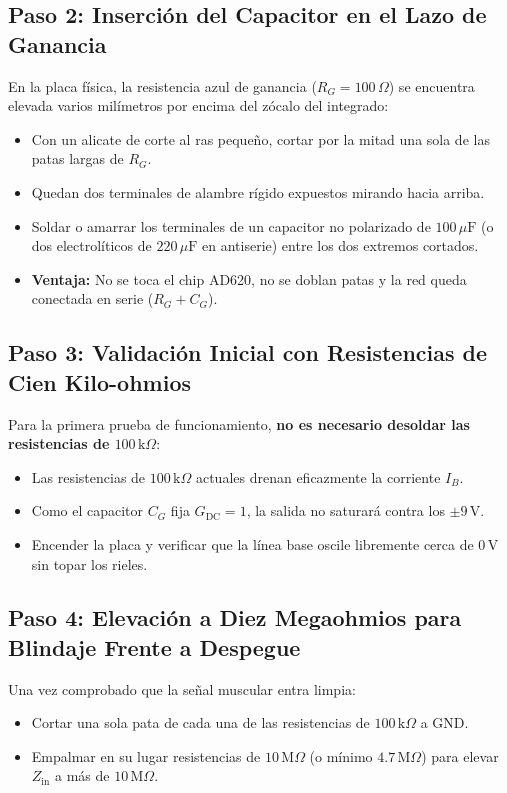 \documentclass[11pt,a4paper]{article}
\begin{document}
\subsection{Paso 2: Inserción del Capacitor en el Lazo de Ganancia}
En la placa física, la resistencia azul de ganancia ($R_G = 100\,\Omega$) se encuentra elevada varios milímetros por encima del zócalo del integrado:
\begin{itemize}
    \item Con un alicate de corte al ras pequeño, cortar por la mitad una sola de las patas largas de $R_G$.
    \item Quedan dos terminales de alambre rígido expuestos mirando hacia arriba.
    \item Soldar o amarrar los terminales de un capacitor no polarizado de $100\,\mu\text{F}$ (o dos electrolíticos de $220\,\mu\text{F}$ en antiserie) entre los dos extremos cortados.
    \item \textbf{Ventaja:} No se toca el chip AD620, no se doblan patas y la red queda conectada en serie ($R_G + C_G$).
\end{itemize}

\subsection{Paso 3: Validación Inicial con Resistencias de Cien Kilo-ohmios}
Para la primera prueba de funcionamiento, \textbf{no es necesario desoldar las resistencias de \(100\,\text{k}\Omega\)}:
\begin{itemize}
    \item Las resistencias de $100\,\text{k}\Omega$ actuales drenan eficazmente la corriente $I_B$.
    \item Como el capacitor $C_G$ fija $G_{\text{DC}} = 1$, la salida no saturará contra los $\pm 9\,\text{V}$.
    \item Encender la placa y verificar que la línea base oscile libremente cerca de $0\,\text{V}$ sin topar los rieles.
\end{itemize}

\subsection{Paso 4: Elevación a Diez Megaohmios para Blindaje Frente a Despegue}
Una vez comprobado que la señal muscular entra limpia:
\begin{itemize}
    \item Cortar una sola pata de cada una de las resistencias de $100\,\text{k}\Omega$ a GND.
    \item Empalmar en su lugar resistencias de $10\,\text{M}\Omega$ (o mínimo $4.7\,\text{M}\Omega$) para elevar $Z_{\text{in}}$ a más de $10\,\text{M}\Omega$.
\end{itemize}
\end{document}
